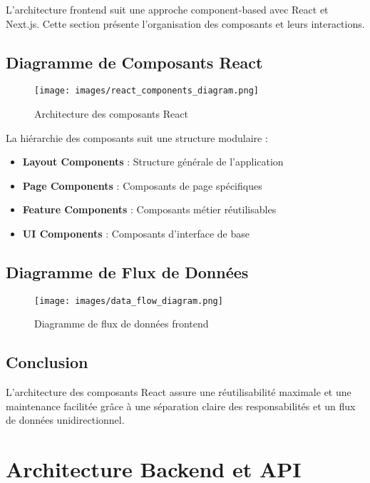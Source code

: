 L'architecture frontend suit une approche component-based avec React et Next.js. Cette section présente l'organisation des composants et leurs interactions.

\subsection{Diagramme de Composants React}

\begin{figure}[H]
    \centering
    \texttt{[image: images/react\_components\_diagram.png]}
    \caption{Architecture des composants React}
    \label{fig:react_components}
\end{figure}

La hiérarchie des composants suit une structure modulaire :
\begin{itemize}
    \item \textbf{Layout Components} : Structure générale de l'application
    \item \textbf{Page Components} : Composants de page spécifiques
    \item \textbf{Feature Components} : Composants métier réutilisables
    \item \textbf{UI Components} : Composants d'interface de base
\end{itemize}

\subsection{Diagramme de Flux de Données}

\begin{figure}[H]
    \centering
    \texttt{[image: images/data\_flow\_diagram.png]}
    \caption{Diagramme de flux de données frontend}
    \label{fig:data_flow}
\end{figure}

\subsection{Conclusion}

L'architecture des composants React assure une réutilisabilité maximale et une maintenance facilitée grâce à une séparation claire des responsabilités et un flux de données unidirectionnel.

\section{Architecture Backend et API}

